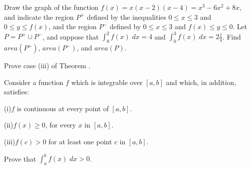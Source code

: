 \begin{exercises}
Draw the graph of the function
$f(x) = x(x-2)(x-4) = x^3 - 6x^2 + 8x$,
and indicate the region $P^+$  defined by the inequalities
$0 \leq x \leq 3$ and $0 \leq y \leq f(x)$, and the region
$P^-$ defined by $0 \leq x \leq 3$ and $f(x) \leq y \leq 0$.
Let $P = P^+ \cup P^-$, and suppose that
$\int_0^2 f(x) \; dx = 4$ and $\int_0^3 f(x) \; dx = 2\frac14$.
Find $\mathit{area}(P^+)$, $\mathit{area}(P^-)$,
and $\mathit{area}(P)$.

Prove case (iii)   of Theorem .

Consider a function $f$ which is integrable over
$[a,b]$ and which, in addition, satisfies:

(i)$f$ is continuous at every point of $[a,b]$.

(ii)$f(x) \geq 0$, for every $x$ in $[a,b]$.

(iii)$f(c) > 0$ for at least one point $c$ in $[a,b]$.

Prove that $\int_a^b f(x) \; dx > 0$.

\end{exercises}
